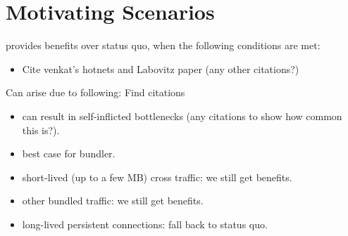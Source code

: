 \section{Motivating Scenarios}
\label{s:deploy}

\name provides benefits over status quo, when the following conditions are met:

\begin{itemize}
    \item Cite venkat's hotnets and Labovitz paper (any other citations?)
\end{itemize}

Can arise due to following:
Find citations
\begin{itemize}
    \item can result in self-inflicted bottlenecks (any citations to show how common this is?).
    \item best case for bundler.
\end{itemize}

\begin{itemize}
    \item short-lived (up to a few MB) cross traffic: we still get benefits.
    \item other bundled traffic: we still get benefits.
    \item long-lived persistent connections: fall back to status quo.
\end{itemize}


